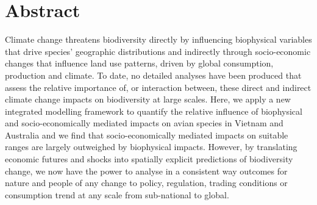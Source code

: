 \pagebreak

\section{Abstract}

Climate change threatens biodiversity directly by influencing biophysical variables that drive species’ geographic distributions and indirectly through socio-economic changes that influence land use patterns, driven by global consumption, production and climate. To date, no detailed analyses have been produced that assess the relative importance of, or interaction between, these direct and indirect climate change impacts on biodiversity at large scales. Here, we apply a new integrated modelling framework to quantify the relative influence of biophysical and socio-economically mediated impacts on avian species in Vietnam and Australia and we find that socio-economically mediated impacts on suitable ranges are largely outweighed by biophysical impacts. However, by translating economic futures and shocks into spatially explicit predictions of biodiversity change, we now have the power to analyse in a consistent way outcomes for nature and people of any change to policy, regulation, trading conditions or consumption trend at any scale from sub-national to global.

